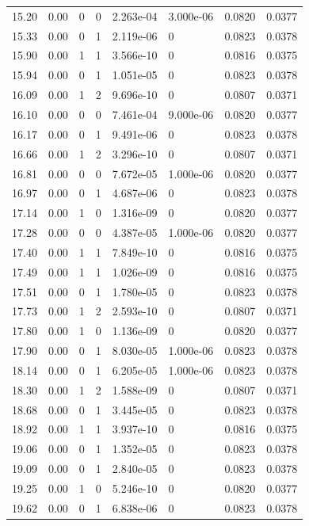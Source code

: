 \documentclass[preview]{standalone}
\begin{document}
{{{\begin{tabular}{L{1.2cm}C{1.2cm} C{0.3cm}C{0.5cm} C{1.4cm}C{1.4cm} C{1.4cm}C{1.4cm}}
  15.20  &  0.00  & 0     &  0 &  2.263e-04  & 3.000e-06  & 0.0820 &  0.0377   \\ 
  15.33  &  0.00  & 0     &  1 &  2.119e-06  & 0  & 0.0823 &  0.0378   \\ 
  15.90  &  0.00  & 1     &  1 &  3.566e-10  & 0  & 0.0816 &  0.0375   \\ 
  15.94  &  0.00  & 0     &  1 &  1.051e-05  & 0  & 0.0823 &  0.0378   \\ 
  16.09  &  0.00  & 1     &  2 &  9.696e-10  & 0  & 0.0807 &  0.0371   \\ 
  16.10  &  0.00  & 0     &  0 &  7.461e-04  & 9.000e-06  & 0.0820 &  0.0377   \\ 
  16.17  &  0.00  & 0     &  1 &  9.491e-06  & 0  & 0.0823 &  0.0378   \\ 
  16.66  &  0.00  & 1     &  2 &  3.296e-10  & 0  & 0.0807 &  0.0371   \\ 
  16.81  &  0.00  & 0     &  0 &  7.672e-05  & 1.000e-06  & 0.0820 &  0.0377   \\ 
  16.97  &  0.00  & 0     &  1 &  4.687e-06  & 0  & 0.0823 &  0.0378   \\ 
  17.14  &  0.00  & 1     &  0 &  1.316e-09  & 0  & 0.0820 &  0.0377   \\ 
  17.28  &  0.00  & 0     &  0 &  4.387e-05  & 1.000e-06  & 0.0820 &  0.0377   \\ 
  17.40  &  0.00  & 1     &  1 &  7.849e-10  & 0  & 0.0816 &  0.0375   \\ 
  17.49  &  0.00  & 1     &  1 &  1.026e-09  & 0  & 0.0816 &  0.0375   \\ 
  17.51  &  0.00  & 0     &  1 &  1.780e-05  & 0  & 0.0823 &  0.0378   \\ 
  17.73  &  0.00  & 1     &  2 &  2.593e-10  & 0  & 0.0807 &  0.0371   \\ 
  17.80  &  0.00  & 1     &  0 &  1.136e-09  & 0  & 0.0820 &  0.0377   \\ 
  17.90  &  0.00  & 0     &  1 &  8.030e-05  & 1.000e-06  & 0.0823 &  0.0378   \\ 
  18.14  &  0.00  & 0     &  1 &  6.205e-05  & 1.000e-06  & 0.0823 &  0.0378   \\ 
  18.30  &  0.00  & 1     &  2 &  1.588e-09  & 0  & 0.0807 &  0.0371   \\ 
  18.68  &  0.00  & 0     &  1 &  3.445e-05  & 0  & 0.0823 &  0.0378   \\ 
  18.92  &  0.00  & 1     &  1 &  3.937e-10  & 0  & 0.0816 &  0.0375   \\ 
  19.06  &  0.00  & 0     &  1 &  1.352e-05  & 0  & 0.0823 &  0.0378   \\ 
  19.09  &  0.00  & 0     &  1 &  2.840e-05  & 0  & 0.0823 &  0.0378   \\ 
  19.25  &  0.00  & 1     &  0 &  5.246e-10  & 0  & 0.0820 &  0.0377   \\ 
  19.62  &  0.00  & 0     &  1 &  6.838e-06  & 0  & 0.0823 &  0.0378   \\ 
\hline 
\end{tabular} 

}}}
\end{document}

